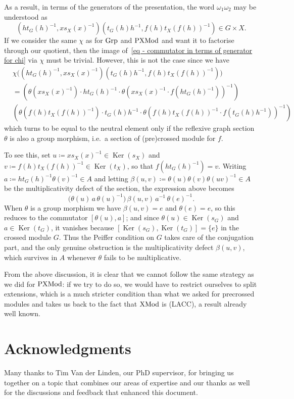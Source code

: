 \documentclass[a4paper, british, reqno]{amsart}
\newcommand*{\eqdef}{\coloneq}
\DeclareMathOperator{\Ker}{Ker} %
\newcommand*{\CatName}[1]{\textnormal{#1}}
\newcommand*{\CondName}[1]{\textnormal{(#1)}}
\newcommand*{\Grp}{\CatName{Grp}}
\newcommand*{\PXMod}{\CatName{PXMod}}
\newcommand*{\XMod}{\CatName{XMod}}
\newcommand*{\LACC}{\CondName{LACC}}
\theoremstyle{definition}
\theoremstyle{remark}
\begin{document}
As a result, in terms of the generators of the presentation, the word \(\omega_1\omega_2\) may be understood as
\begin{equation}\label{eq - commutator in terms of generator for chi}
	(ht_G(h)^{-1}, x s_X(x)^{-1})(t_G(h)h^{-1}, f(h)t_X(f(h))^{-1})\in G\times X\text{.}
\end{equation}
If we consider the same \(\chi\) as for \(\Grp\) and \(\PXMod\) and want it to factorise through our quotient, then the image of~\eqref{eq - commutator in terms of generator for chi} via \(\chi\) must be trivial. However, this is not the case since we have
\begin{align*}
	 & \chi\bigl((ht_G(h)^{-1}, x s_X(x)^{-1})(t_G(h)h^{-1}, f(h)t_X(f(h))^{-1})\bigr)                                     \\
	 & =\left(\theta(xs_X(x)^{-1})\cdot ht_G(h)^{-1}\cdot \theta(xs_X(x)^{-1}\cdot f(ht_G(h)^{-1}))^{-1}\right)            \\
	 & \left(\theta(f(h)t_X(f(h))^{-1})\cdot t_G(h)h^{-1}\cdot \theta(f(h)t_X(f(h))^{-1}\cdot f(t_G(h)h^{-1}))^{-1}\right)
\end{align*}
which turns to be equal to the neutral element only if the reflexive graph section \(\theta\) is also a group morphism, i.e.\ a section of (pre)crossed module for \(f\).

To see this, set \(u\eqdef xs_X(x)^{-1}\in \Ker(s_X)\) and \(v\eqdef f(h)t_X(f(h))^{-1}\in \Ker(t_X)\), so that \(f(ht_G(h)^{-1})=v\). Writing \(a\eqdef ht_G(h)^{-1}\theta(v)^{-1}\in A\) and letting \(\beta(u,v)\eqdef \theta(u)\theta(v)\theta(uv)^{-1}\in A\) be the multiplicativity defect of the section, the expression above becomes
\[
	\bigl(\theta(u)\,a\,\theta(u)^{-1}\bigr)\,\beta(u,v)\,a^{-1}\,\theta(e)^{-1}\text{.}
\]
When \(\theta\) is a group morphism we have \(\beta(u,v)=e\) and \(\theta(e)=e\), so this reduces to the commutator \([\theta(u),a]\); and since \(\theta(u)\in \Ker(s_G)\) and \(a\in \Ker(t_G)\), it vanishes because \([\Ker(s_G),\Ker(t_G)]=\{e\}\) in the crossed module \(G\). Thus the Peiffer condition on \(G\) takes care of the conjugation part, and the only genuine obstruction is the multiplicativity defect \(\beta(u,v)\), which survives in \(A\) whenever \(\theta\) fails to be multiplicative.

From the above discussion, it is clear that we cannot follow the same strategy as we did for \(\PXMod\): if we try to do so, we would have to restrict ourselves to split extensions, which is a much stricter condition than what we asked for precrossed modules and takes us back to the fact that \(\XMod\) is \LACC{}\@, a result already well known.


\section*{Acknowledgments}
Many thanks to Tim Van der Linden, our PhD supervisor, for bringing us together on a topic that combines our areas of expertise and our thanks as well for the discussions and feedback that enhanced this document.



\printbibliography    %
\end{document}
